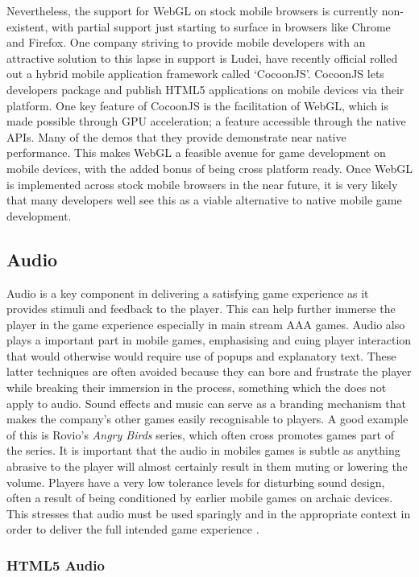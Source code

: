 \documentclass[final]{cmpreport}
\begin{document}
Nevertheless, the support for WebGL on stock mobile browsers is currently non-existent, with partial support just starting to surface in browsers like Chrome and Firefox. One company striving to provide mobile developers with an attractive solution to this lapse in support is Ludei, have recently official rolled out a hybrid mobile application framework called `CocoonJS'. CocoonJS lets developers package and publish HTML5 applications on mobile devices via their platform. One key feature of CocoonJS is the facilitation of WebGL, which is made possible through GPU acceleration; a feature accessible through the native APIs. Many of the demos that they provide demonstrate near native performance. This makes WebGL a feasible avenue for game development on mobile devices, with the added bonus of being cross platform ready. Once WebGL is implemented across stock mobile browsers in the near future, it is very likely that many developers well see this as a viable alternative to native mobile game development.

\subsection{Audio}
 Audio is a key component in delivering a satisfying game experience as it provides stimuli and feedback to the player. This can help further immerse the player in the game experience especially in main stream AAA games. Audio also plays a important part in mobile games, emphasising and cuing player interaction that would otherwise would require use of popups and explanatory text. These latter techniques are often avoided because they can bore and frustrate the player while breaking their immersion in the process, something which the does not apply to audio. Sound effects and music can serve as a branding mechanism that makes the company's other games easily recognisable to players. A good example of this is Rovio's \textit{Angry Birds} series, which often cross promotes games part of the series. It is important that the audio in mobiles games is subtle as anything abrasive to the player will almost certainly result in them muting or lowering the volume. Players have a very low tolerance levels for disturbing sound design, often a result of being conditioned by earlier mobile games on archaic devices. This stresses that audio must be used sparingly and in the appropriate context in order to deliver the full intended game experience \cite{Thomas}.

\subsubsection{HTML5 Audio}
\end{document}
